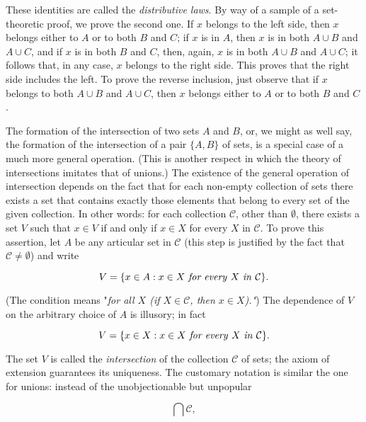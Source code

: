These identities are called the \textit{distributive laws}. By way of a sample of a set-theoretic proof, we prove the second one. If $x$ belongs to the left side, then $x$ belongs either to $A$ or to both $B$ and $C$; if $x$ is in $A$, then $x$ is in both $A \cup B$ and $A \cup C$, and if $x$ is in both $B$ and $C$, then, again, $x$ is in both $A \cup B$ and $A \cup C$; it follows that, in any case, $x$ belongs to the right side. This proves that the right side includes the left. To prove the reverse inclusion, just observe that if $x$ belongs to both $A \cup B$ and $A \cup C$, then $x$ belongs either to $A$ or to both $B$ and $C$. 

The formation of the intersection of two sets $A$ and $B$, or, we might as well say, the formation of the intersection of a pair $ \{ A, B \} $ of sets, is a special case of a much more general operation. (This is another respect in which the theory of intersections imitates that of unions.) The existence of the general operation of intersection depends on the fact that for each non-empty collection of sets there exists a set that contains exactly those elements that belong to every set of the given collection. In other words: for each collection $\mathcal{C}$, other than $ \emptyset $, there exists a set $V$ such that $x \in V$ if and only if $x \in X$ for every $X$ in $\mathcal{C}$. To prove this assertion, let $A$ be any articular set in $\mathcal{C}$ (this step is justified by the fact that $\mathcal{C} \neq \emptyset$) and write

\begin{equation*}
V = \{ x \in A: x \in X \text{ \textit{for every} } X \text{ \textit{in} } \mathcal{C} \}.
\end{equation*}

(The condition means "\textit{for all $X$ (if $X \in \mathcal{C}$, then $x \in X$)."}) The dependence of $V$ on the arbitrary choice of $A$ is illusory; in fact

\begin{equation*}
V = \{ x \in X: x \in X \text{ \textit{for every} } X \text{ \textit{in} } \mathcal{C} \}.
\end{equation*}

The set $V$ is called the \textit{intersection} of the collection $ \mathcal{C} $ of sets; the axiom of extension guarantees its uniqueness. The customary notation is similar the one for unions: instead of the unobjectionable but unpopular

\begin{equation*}
\bigcap \mathcal{C} ,
\end{equation*}

